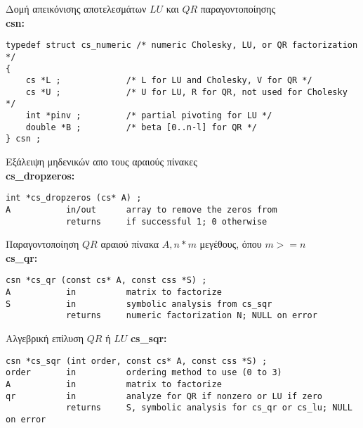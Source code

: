Δομή απεικόνισης αποτελεσμάτων $LU$ και $QR$ παραγοντοποίησης\\
\textbf{csn:}
\begin{verbatim}
typedef struct cs_numeric /* numeric Cholesky, LU, or QR factorization */
{
    cs *L ;             /* L for LU and Cholesky, V for QR */
    cs *U ;             /* U for LU, R for QR, not used for Cholesky */
    int *pinv ;         /* partial pivoting for LU */
    double *B ;         /* beta [0..n-l] for QR */
} csn ;
\end{verbatim}


Εξάλειψη μηδενικών απο τους αραιούς πίνακες\\
\textbf{cs\_dropzeros:}
\begin{verbatim}
int *cs_dropzeros (cs* A) ;
A           in/out      array to remove the zeros from
            returns     if successful 1; 0 otherwise
\end{verbatim}

Παραγοντοποίηση $QR$ αραιού πίνακα $A, n * m$ μεγέθους, όπου $m >= n$\\
\textbf{cs\_qr:}
\begin{verbatim}
csn *cs_qr (const cs* A, const css *S) ;
A           in          matrix to factorize
S           in          symbolic analysis from cs_sqr
            returns     numeric factorization N; NULL on error
\end{verbatim}


Αλγεβρική επίλυση $QR$ ή $LU$
\textbf{cs\_sqr:}
\begin{verbatim}
csn *cs_sqr (int order, const cs* A, const css *S) ;
order       in          ordering method to use (0 to 3)
A           in          matrix to factorize
qr          in          analyze for QR if nonzero or LU if zero
            returns     S, symbolic analysis for cs_qr or cs_lu; NULL on error
\end{verbatim}


